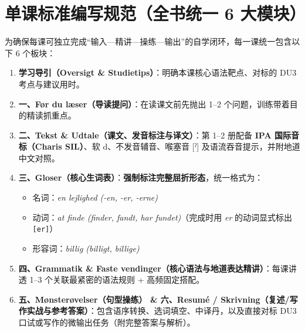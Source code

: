 \documentclass[10.5pt, a4paper]{ctexart}
\begin{document}
\section{单课标准编写规范（全书统一 6 大模块）}

为确保每课可独立完成“输入—精讲—操练—输出”的自学闭环，每一课统一包含以下 6 个板块：

\begin{enumerate}
  \item \textbf{学习导引（Oversigt \& Studietips）}：明确本课核心语法靶点、对标的 DU3 考点与建议用时。
  \item \textbf{一、Før du læser（导读提问）}：在读课文前先抛出 1--2 个问题，训练带着目的精读抓重点。
  \item \textbf{二、Tekst \& Udtale（课文、发音标注与译文）}：第 1--2 册配备 \textbf{IPA 国际音标（Charis SIL）}、软 d、不发音辅音、喉塞音 [ˀ] 及语流吞音提示，并附地道中文对照。
  \item \textbf{三、Gloser（核心生词表）}：\textbf{强制标注完整屈折形态}，统一格式为：
    \begin{itemize}
      \item 名词：\textit{en lejlighed (-en, -er, -erne)}
      \item 动词：\textit{at finde (finder, fandt, har fundet)}（完成时用 \textit{er} 的动词显式标出 \texttt{[er]}）
      \item 形容词：\textit{billig (billigt, billige)}
    \end{itemize}
  \item \textbf{四、Grammatik \& Faste vendinger（核心语法与地道表达精讲）}：每课讲透 1--3 个关联最紧密的语法规则 + 高频固定搭配。
  \item \textbf{五、Mønsterøvelser（句型操练） \& 六、Resumé / Skrivning（复述/写作实战与参考答案）}：包含语序转换、选词填空、中译丹，以及直接对标 DU3 口试或写作的微输出任务（附完整答案与解析）。
\end{enumerate}
\end{document}
